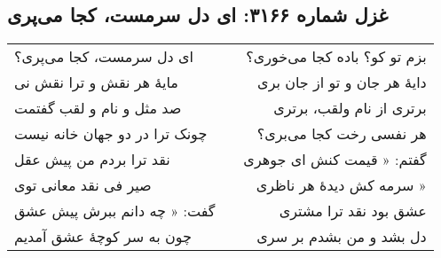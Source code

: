 \begin{center}
\section*{غزل شماره ۳۱۶۶: ای دل سرمست، کجا می‌پری}
\label{sec:3166}
\begin{longtable}{l p{0.5cm} r}
ای دل سرمست، کجا می‌پری؟
&&
بزم تو کو؟ باده کجا می‌خوری؟
\\
مایهٔ هر نقش و ترا نقش نی
&&
دایهٔ هر جان و تو از جان بری
\\
صد مثل و نام و لقب گفتمت
&&
برتری از نام ولقب، برتری
\\
چونک ترا در دو جهان خانه نیست
&&
هر نفسی رخت کجا می‌بری؟
\\
نقد ترا بردم من پیش عقل
&&
گفتم: « قیمت کنش ای جوهری
\\
صیر فی نقد معانی توی
&&
سرمه کش دیدهٔ هر ناظری »
\\
گفت: « چه دانم ببرش پیش عشق
&&
عشق بود نقد ترا مشتری
\\
چون به سر کوچهٔ عشق آمدیم
&&
دل بشد و من بشدم بر سری
\\
\end{longtable}
\end{center}
